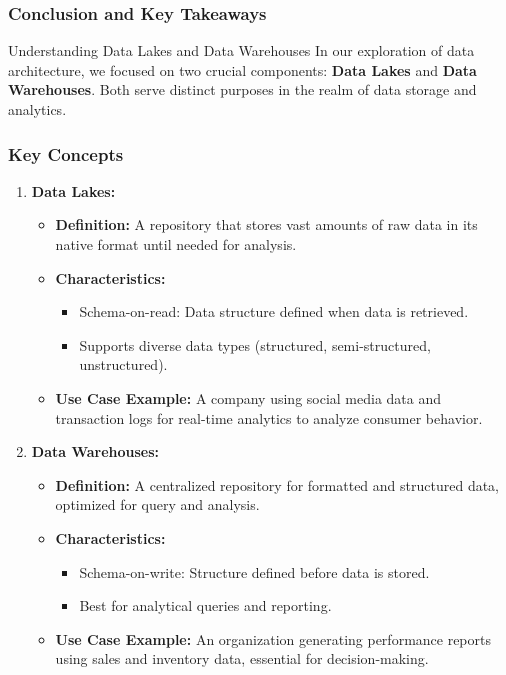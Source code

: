 \documentclass[aspectratio=169]{beamer}
\begin{document}
\begin{frame}[fragile]
    \frametitle{Conclusion and Key Takeaways}
    
    \begin{block}{Understanding Data Lakes and Data Warehouses}
        In our exploration of data architecture, we focused on two crucial components: \textbf{Data Lakes} and \textbf{Data Warehouses}. Both serve distinct purposes in the realm of data storage and analytics.
    \end{block}
\end{frame}

\begin{frame}[fragile]
    \frametitle{Key Concepts}
    
    \begin{enumerate}
        \item \textbf{Data Lakes:}
        \begin{itemize}
            \item \textbf{Definition:} A repository that stores vast amounts of raw data in its native format until needed for analysis.
            \item \textbf{Characteristics:}
            \begin{itemize}
                \item Schema-on-read: Data structure defined when data is retrieved.
                \item Supports diverse data types (structured, semi-structured, unstructured).
            \end{itemize}
            \item \textbf{Use Case Example:} A company using social media data and transaction logs for real-time analytics to analyze consumer behavior.
        \end{itemize}

        \item \textbf{Data Warehouses:}
        \begin{itemize}
            \item \textbf{Definition:} A centralized repository for formatted and structured data, optimized for query and analysis.
            \item \textbf{Characteristics:}
            \begin{itemize}
                \item Schema-on-write: Structure defined before data is stored.
                \item Best for analytical queries and reporting.
            \end{itemize}
            \item \textbf{Use Case Example:} An organization generating performance reports using sales and inventory data, essential for decision-making.
        \end{itemize}
    \end{enumerate}
\end{frame}
\end{document}

